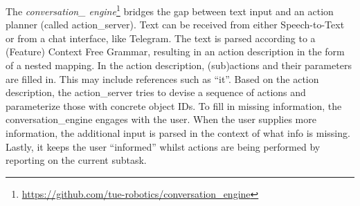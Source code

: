 \label{ssec:conversation}
\noindent The \emph{conversation\_ engine}\footnote{\url{https://github.com/tue-robotics/conversation_engine}} bridges the gap between text input and an action planner (called action\_server). Text can be received from either Speech-to-Text or from a chat interface, like Telegram\texttrademark\hspace{0em}. The text is parsed according to a (Feature) Context Free Grammar, resulting in an action description in the form of a nested mapping. In the action description, (sub)actions and their parameters are filled in.
This may include references such as “it”.
Based on the action description, the action\_server tries to devise a sequence of actions and parameterize those with concrete object IDs.
To fill in missing information, the conversation\_engine engages with the user. When the user supplies more information, the additional input is parsed in the context of what info is missing. %
Lastly, it keeps the user “informed” whilst actions are being performed by reporting on the current subtask.
